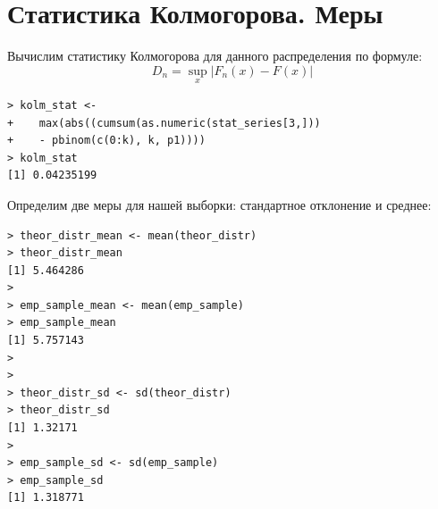 \documentclass[14pt,a4paper]{scrartcl}
\begin{document}
\section{Статистика Колмогорова. Меры}
Вычислим статистику Колмогорова для данного распределения по формуле:
\begin{equation*}
	D_{n}=\sup _{x}\left|F_{n}(x)-F(x)\right|
\end{equation*}

\begin{lstlisting}
> kolm_stat <- 
+    max(abs((cumsum(as.numeric(stat_series[3,]))
+    - pbinom(c(0:k), k, p1))))
> kolm_stat
[1] 0.04235199
\end{lstlisting}

Определим две меры для нашей выборки: стандартное отклонение и среднее:
\begin{lstlisting}
> theor_distr_mean <- mean(theor_distr)
> theor_distr_mean
[1] 5.464286
> 
> emp_sample_mean <- mean(emp_sample)
> emp_sample_mean
[1] 5.757143
> 
> 
> theor_distr_sd <- sd(theor_distr)
> theor_distr_sd
[1] 1.32171
> 
> emp_sample_sd <- sd(emp_sample)
> emp_sample_sd
[1] 1.318771
\end{lstlisting}
\end{document}
